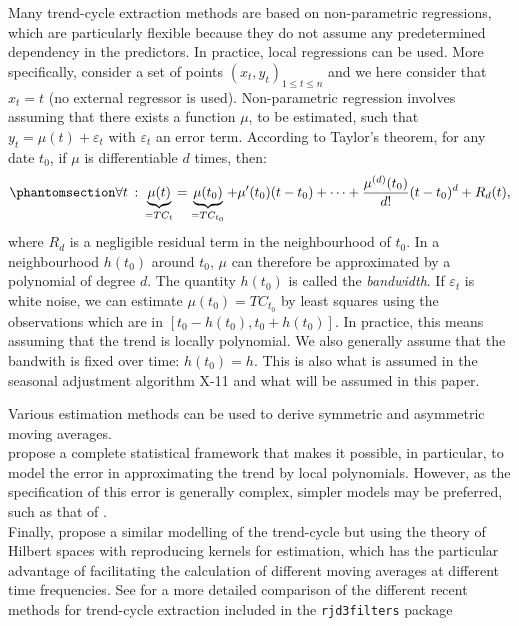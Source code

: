 \documentclass[
]{article}
\newcommand\1{\mathds{1}}
\begin{document}
Many trend-cycle extraction methods are based on non-parametric
regressions, which are particularly flexible because they do not assume
any predetermined dependency in the predictors. In practice, local
regressions can be used. More specifically, consider a set of points
\((x_t,y_t)_{1\leq t\leq n}\) and we here consider that \(x_t=t\) (no
external regressor is used). Non-parametric regression involves assuming
that there exists a function \(\mu\), to be estimated, such that
\(y_t=\mu(t)+\varepsilon_t\) with \(\varepsilon_t\) an error term.
According to Taylor's theorem, for any date \(t_0\), if \(\mu\) is
differentiable \(d\) times, then:
\begin{equation}\phantomsection\label{eq-taylor}{
\forall t \::\:\underbrace{\mu(t)}_{=TC_t} = \underbrace{\mu(t_0)}_{=TC_{t_0}} + \mu'(t_0)(t-t_0)+\dots +
\frac{\mu^{(d)}(t_0)}{d!}(t-t_0)^d+R_d(t),
}\end{equation} where \(R_d\) is a negligible residual term in the
neighbourhood of \(t_0\). In a neighbourhood \(h(t_0)\) around \(t_0\),
\(\mu\) can therefore be approximated by a polynomial of degree \(d\).
The quantity \(h(t_0)\) is called the \emph{bandwidth}. If
\(\varepsilon_t\) is white noise, we can estimate \(\mu(t_0)=TC_{t_0}\)
by least squares using the observations which are in
\(\left[t_0-h(t_0),t_0+h(t_0)\right]\). In practice, this means assuming
that the trend is locally polynomial. We also generally assume that the
bandwith is fixed over time: \(h(t_0)=h.\) This is also what is assumed
in the seasonal adjustment algorithm X-11 and what will be assumed in
this paper.

Various estimation methods can be used to derive symmetric and
asymmetric moving averages.\\
\textcite{GrayThomson1996} propose a complete statistical framework that
makes it possible, in particular, to model the error in approximating
the trend by local polynomials. However, as the specification of this
error is generally complex, simpler models may be preferred, such as
that of \textcite{proietti2008}.\\
Finally, \textcite{dagumbianconcini2008} propose a similar modelling of
the trend-cycle but using the theory of Hilbert spaces with reproducing
kernels for estimation, which has the particular advantage of
facilitating the calculation of different moving averages at different
time frequencies. See \textcite{inseeDTM202401} for a more detailed
comparison of the different recent methods for trend-cycle extraction
included in the \texttt{rjd3filters} package
\end{document}
